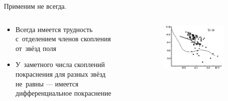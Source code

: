 \documentclass{beamer}
\begin{document}
    \begin{frame}
        Применим не всегда.
        \begin{columns}
            \begin{column}{0.5\textwidth}
                    \begin{itemize}
                        \item Всегда имеется трудность с~отделением членов скопления от~звёзд поля
                        \item У~заметного числа скоплений покраснения для разных звёзд не~равны --- имеется дифференциальное покраснение
                    \end{itemize}
            \end{column}
            \begin{column}{0.5\textwidth}
                \begin{figure}
                \centering
                    \includegraphics[width=0.9\textwidth]{pictures/Tr2Col.jpg}
                \end{figure}
            \end{column}
        \end{columns}
    \end{frame}
\end{document}
